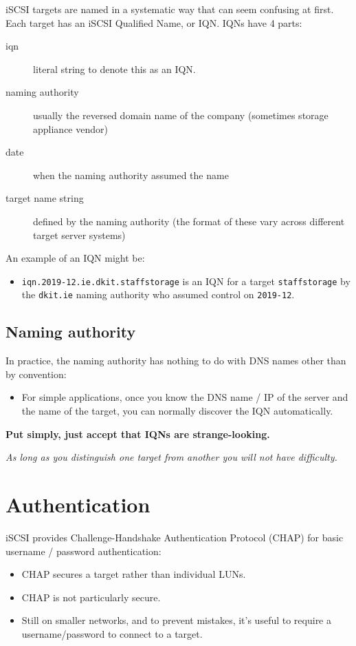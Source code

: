 \documentclass[slides]{pgnotes}
\begin{document}
iSCSI targets are named in a systematic way that can seem confusing at
first. Each target has an iSCSI Qualified Name, or IQN. IQNs have 4
parts:

\begin{description}
\item[iqn]
literal string to denote this as an IQN.
\item[naming authority]
usually the reversed domain name of the company (sometimes storage
appliance vendor)
\item[date]
when the naming authority assumed the name
\item[target name string]
defined by the naming authority (the format of these vary across
different target server systems)
\end{description}

An example of an IQN might be:

\begin{itemize}
\item
  \texttt{iqn.2019-12.ie.dkit.staffstorage} is an IQN for a target
  \texttt{staffstorage} by the \texttt{dkit.ie} naming authority who
  assumed control on \texttt{2019-12}.
\end{itemize}

\subsection{Naming authority}

In practice, the naming authority has nothing to do with DNS names other
than by convention:
\begin{itemize}
\item For simple applications, once you know the DNS name / IP of the server and the name of the target, you can normally discover the IQN automatically.
\end{itemize}

\begin{center}
  \textbf{Put simply, just accept that IQNs are strange-looking.}
\end{center}
  
  \textit{As long as you
distinguish one target from another you will not have difficulty.}

\section{Authentication}
\label{sec:username-passwords}

iSCSI provides Challenge-Handshake Authentication Protocol (CHAP) for basic username / password authentication:
\begin{itemize}
\item CHAP secures a target rather than individual LUNs.
\item CHAP is not particularly secure.
\item Still on smaller networks, and to prevent mistakes, it's useful to
  require a username/password to connect to a target.
\end{itemize}
\end{document}
